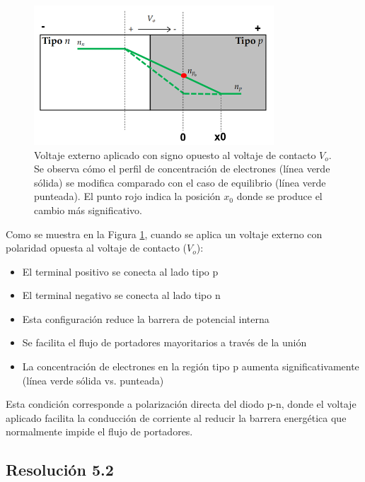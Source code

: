 \documentclass[
  11pt,
  letterpaper,
   addpoints,
   answers
  ]{exam}
\begin{document}
\begin{questions}
\begin{solution}
    \begin{figure}[H]
        \centering
        \includegraphics[width=0.8\textwidth]{../figures/Auxiliar_2_11}
        \caption{Voltaje externo aplicado con signo opuesto al voltaje de contacto $V_o$. Se observa cómo el perfil de concentración de electrones (línea verde sólida) se modifica comparado con el caso de equilibrio (línea verde punteada). El punto rojo indica la posición $x_0$ donde se produce el cambio más significativo.}
        \label{fig:voltaje_externo}
    \end{figure}

    Como se muestra en la Figura \ref{fig:voltaje_externo}, cuando se aplica un voltaje externo con polaridad opuesta al voltaje de contacto ($V_o$):

    \begin{itemize}
        \item El terminal positivo se conecta al lado tipo p
        \item El terminal negativo se conecta al lado tipo n
        \item Esta configuración reduce la barrera de potencial interna
        \item Se facilita el flujo de portadores mayoritarios a través de la unión
        \item La concentración de electrones en la región tipo p aumenta significativamente (línea verde sólida vs. punteada)
    \end{itemize}

    Esta condición corresponde a polarización directa del diodo p-n, donde el voltaje aplicado facilita la conducción de corriente al reducir la barrera energética que normalmente impide el flujo de portadores.

    \subsection*{Resolución 5.2}
    

\end{solution}
\end{questions}
\end{document}
